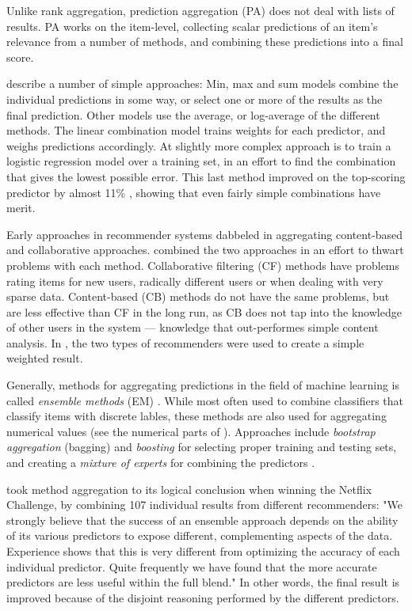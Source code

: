 Unlike rank aggregation, prediction aggregation (PA) does not deal with lists of results.
PA works on the item-level, collecting scalar predictions of an item's relevance from a number of methods,
and combining these predictions into a final score.

\cite{Aslam2001} describe a number of simple approaches:
Min, max and sum models combine the individual predictions in some way, 
or select one or more of the results as the final prediction. 
Other models use the average, or log-average of the different methods.
The linear combination model trains weights for each predictor, and weighs predictions accordingly.
At slightly more complex approach is to train a logistic regression model \cite[p3]{Aslam2001}
over a training set, in an effort to find the combination that gives the lowest possible error.
This last method improved on the top-scoring predictor by almost 11\% \cite[p3]{Aslam2001},
showing that even fairly simple combinations have merit.

Early approaches in recommender systems dabbeled in aggregating content-based and collaborative approaches.
\cite{Claypool1999} combined the two approaches in an effort to thwart problems with each method.
Collaborative filtering (CF) methods have problems rating items for new users, radically different users or when dealing with very sparse data.
Content-based (CB) methods do not have the same problems, but are less effective than CF in the long run, as CB does not tap into the 
knowledge of other users in the system --- knowledge that out-performes simple content analysis.
In \cite{Claypool1999}, the two types of recommenders were used to create a simple weighted result.

Generally, methods for aggregating predictions in the field of machine learning is called \emph{ensemble methods} (EM) \cite[p1]{Dietterich2000}.
While most often used to combine classifiers that classify items with discrete lables,
these methods are also used for aggregating numerical values (see the numerical parts of \cite{Breiman1996}).
Approaches include \emph{bootstrap aggregation} (bagging) and \emph{boosting} 
for selecting proper training and testing sets,
and creating a \emph{mixture of experts} for combining the predictors
\cite[p27]{Polikar2006}.


\cite{Bell2007} took method aggregation to its logical conclusion when winning the Netflix Challenge,
by combining 107 individual results from different recommenders: 
"We strongly believe that the success of an ensemble approach depends on the ability of its various predictors to expose different, 
complementing aspects of the data. Experience shows that this is very different from optimizing the accuracy of each individual predictor. 
Quite frequently we have found that the more accurate predictors are less useful within the full blend." \cite[p6]{Bell2007}
In other words, the final result is improved because of the disjoint reasoning performed by the different predictors.

